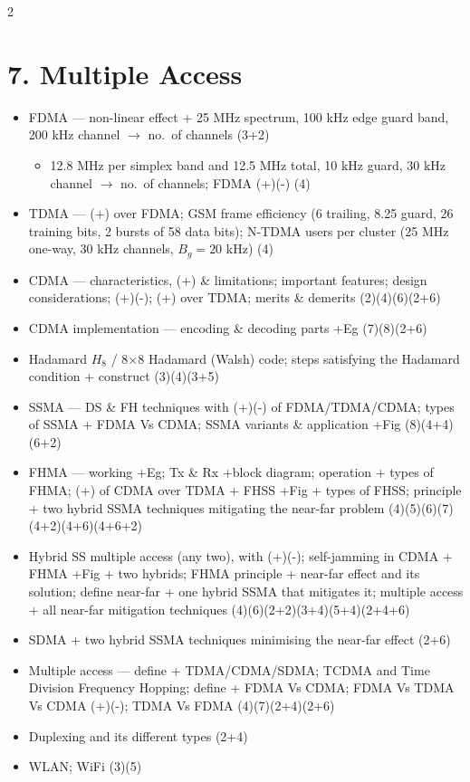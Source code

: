 \documentclass[10pt]{article}
\begin{document}
\begin{multicols}{2}
\section*{7. Multiple Access}
\begin{itemize}
  \item FDMA --- non-linear effect + 25 MHz spectrum, 100 kHz edge guard band, 200 kHz channel $\rightarrow$ no.\ of channels \hfill (3+2)
    \begin{itemize}
      \item 12.8 MHz per simplex band and 12.5 MHz total, 10 kHz guard, 30 kHz channel $\rightarrow$ no.\ of channels; FDMA (+)(-) \hfill (4)
    \end{itemize}
  \item TDMA --- (+) over FDMA; GSM frame efficiency (6 trailing, 8.25 guard, 26 training bits, 2 bursts of 58 data bits); N-TDMA users per cluster (25 MHz one-way, 30 kHz channels, $B_g{=}20$ kHz) \hfill (4)
  \item CDMA --- characteristics, (+) \& limitations; important features; design considerations; (+)(-); (+) over TDMA; merits \& demerits \hfill (2)(4)(6)(2+6)
  \item CDMA implementation --- encoding \& decoding parts +Eg \hfill (7)(8)(2+6)
  \item Hadamard $H_8$ / 8$\times$8 Hadamard (Walsh) code; steps satisfying the Hadamard condition + construct \hfill (3)(4)(3+5)
  \item SSMA --- DS \& FH techniques with (+)(-) of FDMA/TDMA/CDMA; types of SSMA + FDMA Vs CDMA; SSMA variants \& application +Fig \hfill (8)(4+4)(6+2)
  \item FHMA --- working +Eg; Tx \& Rx +block diagram; operation + types of FHMA; (+) of CDMA over TDMA + FHSS +Fig + types of FHSS; principle + two hybrid SSMA techniques mitigating the near-far problem \hfill (4)(5)(6)(7)(4+2)(4+6)(4+6+2)
  \item Hybrid SS multiple access (any two), with (+)(-); self-jamming in CDMA + FHMA +Fig + two hybrids; FHMA principle + near-far effect and its solution; define near-far + one hybrid SSMA that mitigates it; multiple access + all near-far mitigation techniques \hfill (4)(6)(2+2)(3+4)(5+4)(2+4+6)
  \item SDMA + two hybrid SSMA techniques minimising the near-far effect \hfill (2+6)
  \item Multiple access --- define + TDMA/CDMA/SDMA; TCDMA and Time Division Frequency Hopping; define + FDMA Vs CDMA; FDMA Vs TDMA Vs CDMA (+)(-); TDMA Vs FDMA \hfill (4)(7)(2+4)(2+6)
  \item Duplexing and its different types \hfill (2+4)
  \item WLAN; WiFi \hfill (3)(5)
\end{itemize}


\end{multicols}
\end{document}
